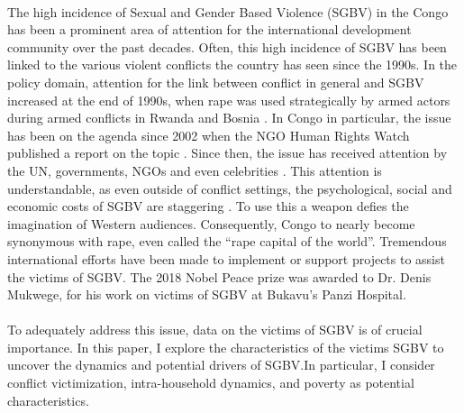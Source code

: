 \documentclass[11pt,a4paper]{scrartcl} %
\begin{document}
\paragraph{}
The high incidence of Sexual and Gender Based Violence (SGBV) in the Congo has been a prominent area of attention for the international development community over the past decades. Often, this high incidence of SGBV has been linked to the various violent conflicts the country has seen since the 1990s. In the policy domain, attention for the link between conflict in general and SGBV increased at the end of 1990s, when rape was used strategically by armed actors during armed conflicts in Rwanda and Bosnia  \citep{Kirby2015}. In Congo in particular, the issue has been on the agenda since 2002 when the NGO Human Rights Watch published a report on the topic \citep{HRW2002}. Since then, the issue has received attention by the UN, governments, NGOs and even celebrities \citep{Baaz2013}. This attention is understandable, as even outside of conflict settings, the psychological, social and economic costs of SGBV are staggering \citep{Post2002,Peterson2018}. To use this a weapon defies the imagination of Western audiences. Consequently, Congo to nearly become synonymous with rape, even called the ``rape capital of the world''. Tremendous international efforts have been made to implement or support projects to assist the victims of SGBV. The 2018 Nobel Peace prize was awarded to Dr. Denis Mukwege, for his work on victims of SGBV at Bukavu's Panzi Hospital.
 
\paragraph{}
To adequately address this issue, data on the victims of SGBV is of crucial importance. In this paper, I explore the characteristics of the victims SGBV to uncover the dynamics and potential drivers of SGBV.In particular, I consider conflict victimization, intra-household dynamics, and poverty as potential characteristics.

\paragraph{}

\end{document}
